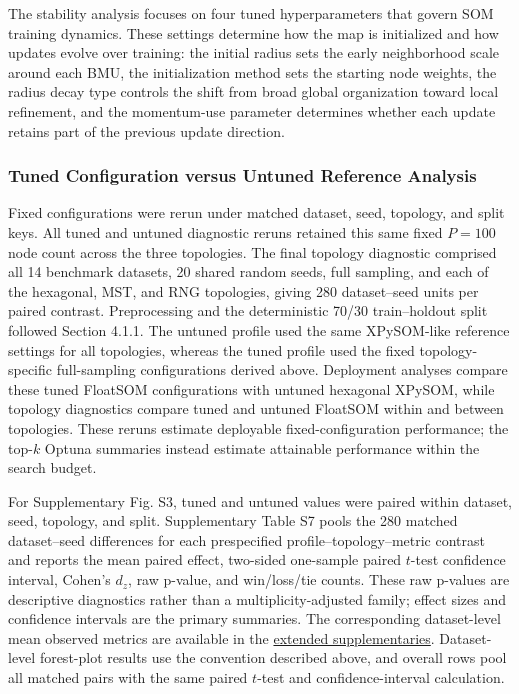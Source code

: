 \documentclass[10pt]{article} %
\begin{document}
The stability analysis focuses on four tuned hyperparameters that govern SOM training dynamics. These settings determine how the map is initialized and how updates evolve over training: the initial radius sets the early neighborhood scale around each BMU, the initialization method sets the starting node weights, the radius decay type controls the shift from broad global organization toward local refinement, and the momentum-use parameter determines whether each update retains part of the previous update direction.

\subsubsection{Tuned Configuration versus Untuned Reference Analysis}

Fixed configurations were rerun under matched dataset, seed, topology, and split keys. All tuned and untuned diagnostic reruns retained this same fixed $P=100$ node count across the three topologies. The final topology diagnostic comprised all 14 benchmark datasets, 20 shared random seeds, full sampling, and each of the hexagonal, MST, and RNG topologies, giving 280 dataset--seed units per paired contrast. Preprocessing and the deterministic 70/30 train--holdout split followed Section 4.1.1. The untuned profile used the same XPySOM-like reference settings for all topologies, whereas the tuned profile used the fixed topology-specific full-sampling configurations derived above. Deployment analyses compare these tuned FloatSOM configurations with untuned hexagonal XPySOM, while topology diagnostics compare tuned and untuned FloatSOM within and between topologies. These reruns estimate deployable fixed-configuration performance; the top-$k$ Optuna summaries instead estimate attainable performance within the search budget.

For Supplementary Fig. S3, tuned and untuned values were paired within dataset, seed, topology, and split. Supplementary Table S7 pools the 280 matched dataset--seed differences for each prespecified profile--topology--metric contrast and reports the mean paired effect, two-sided one-sample paired $t$-test confidence interval, Cohen's $d_z$, raw p-value, and win/loss/tie counts. These raw p-values are descriptive diagnostics rather than a multiplicity-adjusted family; effect sizes and confidence intervals are the primary summaries. The corresponding dataset-level mean observed metrics are available in the \href{https://github.com/1ordinateur/floatsom-publication/blob/main/extended_supplementaries.zip}{extended supplementaries}. Dataset-level forest-plot results use the convention described above, and overall rows pool all matched pairs with the same paired $t$-test and confidence-interval calculation.
\end{document}
